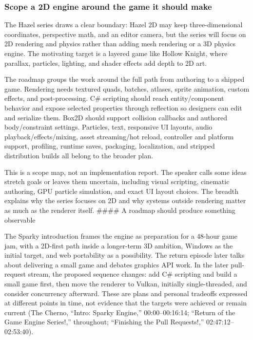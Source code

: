 \subsubsection{Scope a 2D engine around the game it should make}\label{06-engine-ii-ch041-scope-a-2d-engine-around-the-game-it-should-make}

\hypertarget{06-engine-ii-ch041-scope-a-2d-engine-around-the-game-it-should-make}{}

The Hazel series draws a clear boundary: Hazel 2D may keep three-dimensional coordinates, perspective math, and an editor camera, but the series will focus on 2D rendering and physics rather than adding mesh rendering or a 3D physics engine. The motivating target is a layered game like Hollow Knight, where parallax, particles, lighting, and shader effects add depth to 2D art.

The roadmap groups the work around the full path from authoring to a shipped game. Rendering needs textured quads, batches, atlases, sprite animation, custom effects, and post-processing. C\# scripting should reach entity/component behavior and expose selected properties through reflection so designers can edit and serialize them. Box2D should support collision callbacks and authored body/constraint settings. Particles, text, responsive UI layouts, audio playback/effects/mixing, asset streaming/hot reload, controller and platform support, profiling, runtime saves, packaging, localization, and stripped distribution builds all belong to the broader plan.

This is a scope map, not an implementation report. The speaker calls some ideas stretch goals or leaves them uncertain, including visual scripting, cinematic authoring, GPU particle simulation, and exact UI layout choices. The breadth explains why the series focuses on 2D and why systems outside rendering matter as much as the renderer itself. \#\#\#\# A roadmap should produce something observable

The Sparky introduction frames the engine as preparation for a 48-hour game jam, with a 2D-first path inside a longer-term 3D ambition, Windows as the initial target, and web portability as a possibility. The return episode later talks about delivering a small game and debates graphics API work. In the later pull-request stream, the proposed sequence changes: add C\# scripting and build a small game first, then move the renderer to Vulkan, initially single-threaded, and consider concurrency afterward. These are plans and personal tradeoffs expressed at different points in time, not evidence that the targets were achieved or remain current (The Cherno, ``Intro: Sparky Engine,'' 00:00--00:16:14; ``Return of the Game Engine Series!,'' throughout; ``Finishing the Pull Requests!,'' 02:47:12--02:53:40).

